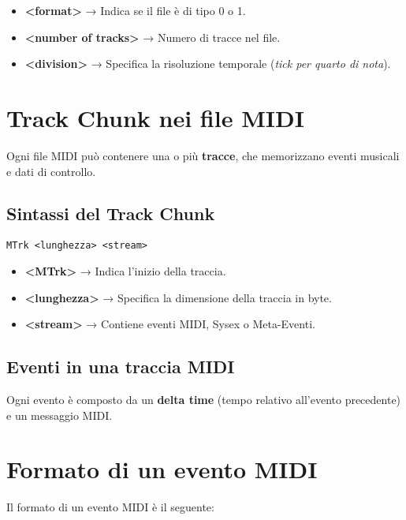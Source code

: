 \begin{itemize}
    \item \textbf{\textless{}format\textgreater{}} → Indica se il file è di tipo 0 o 1.
    \item \textbf{\textless{}number of tracks\textgreater{}} → Numero di tracce nel file.
    \item \textbf{\textless{}division\textgreater{}} → Specifica la risoluzione temporale (\textit{tick per quarto di nota}).
\end{itemize}

\section{Track Chunk nei file MIDI}

Ogni file MIDI può contenere una o più \textbf{tracce}, che memorizzano eventi musicali e dati di controllo.

\subsection*{Sintassi del Track Chunk}

\begin{verbatim}
MTrk <lunghezza> <stream>
\end{verbatim}

\begin{itemize}
    \item \textbf{\textless{}MTrk\textgreater{}} → Indica l'inizio della traccia.
    \item \textbf{\textless{}lunghezza\textgreater{}} → Specifica la dimensione della traccia in byte.
    \item \textbf{\textless{}stream\textgreater{}} → Contiene eventi MIDI, Sysex o Meta-Eventi.
\end{itemize}

\subsection*{Eventi in una traccia MIDI}

Ogni evento è composto da un \textbf{delta time} (tempo relativo all'evento precedente) e un messaggio MIDI.

\section*{Formato di un evento MIDI}

Il formato di un evento MIDI è il seguente:

